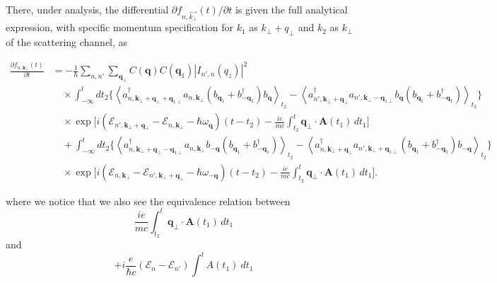 \documentclass[%
 reprint,
 amsmath,amssymb,
 aps,
]{revtex4-2}
\begin{document}
There, under analysis, the differential $\partial f_{n,\vec{k_{\bot}}}(t) / {\partial t}$ is given the full analytical expression, with specific momentum specification for $k_{1}$ as $k_{\perp}+q_{\perp}$ and $k_{2}$ as $k_{\perp}$ of the scattering channel, as
\begin{widetext}
    \begin{align}
\frac{\partial f_{n,\mathbf{k}_{\perp}}(t)}{\partial t}
&=
-\frac{1}{\hbar}
\sum_{n,n'}
\sum_{\mathbf{q}_{\perp}}
C(\mathbf{q})
C(\mathbf{q}_1)
\left| I_{n',n}(q_z) \right|^2
\nonumber\\
&\quad \times
\int_{-\infty}^{t}
dt_2
\Bigg\{
\left\langle
a^\dagger_{n,\mathbf{k}_{\perp}+\mathbf{q}_{\perp}+\mathbf{q}_{1\perp}}
a_{n,\mathbf{k}_{\perp}}
\left(b_{\mathbf{q}_1}+b^\dagger_{-\mathbf{q}_1}\right)
b_{\mathbf{q}}
\right\rangle_{t_2}
-
\left\langle
a^\dagger_{n',\mathbf{k}_{\perp}+\mathbf{q}_{\perp}}
a_{n',\mathbf{k}_{\perp}-\mathbf{q}_{1\perp}}
b_{\mathbf{q}}
\left(b_{\mathbf{q}_1}+b^\dagger_{-\mathbf{q}_1}\right)
\right\rangle_{t_2}
\Bigg\}
\nonumber\\
&\quad \times
\exp\Bigg[
i
\left(
\mathcal{E}_{n',\mathbf{k}_{\perp}+\mathbf{q}_{\perp}}
-
\mathcal{E}_{n,\mathbf{k}_{\perp}}
-
\hbar\omega_{\mathbf{q}}
\right)
(t-t_2)
-
\frac{ie}{mc}
\int_{t_2}^{t}
\mathbf{q}_{\perp}\!\cdot\!
\mathbf{A}(t_1)\,
dt_1
\Bigg]
\nonumber\\
&\quad
+
\int_{-\infty}^{t}
dt_2
\Bigg\{
\left\langle
a^\dagger_{n,\mathbf{k}_{\perp}+\mathbf{q}_{\perp}-\mathbf{q}_{1\perp}}
a_{n,\mathbf{k}_{\perp}}
b_{-\mathbf{q}}
\left(b_{\mathbf{q}_1}+b^\dagger_{-\mathbf{q}_1}\right)
\right\rangle_{t_2}
-
\left\langle
a^\dagger_{n,\mathbf{k}_{\perp}+\mathbf{q}_{\perp}}
a_{n',\mathbf{k}_{\perp}+\mathbf{q}_{1\perp}}
\left(b_{\mathbf{q}_1}+b^\dagger_{-\mathbf{q}_1}\right)
b_{-\mathbf{q}}
\right\rangle_{t_2}
\Bigg\}
\nonumber\\
&\quad \times
\exp\Bigg[
i
\left(
\mathcal{E}_{n,\mathbf{k}_{\perp}}
-
\mathcal{E}_{n',\mathbf{k}_{\perp}+\mathbf{q}_{\perp}}
-
\hbar\omega_{-\mathbf{q}}
\right)
(t-t_2)
-
\frac{ie}{mc}
\int_{t_2}^{t}
\mathbf{q}_{\perp}\!\cdot\!
\mathbf{A}(t_1)\,
dt_1
\Bigg].
\end{align}
\end{widetext}
where we notice that we also see the equivalence relation between
\begin{equation}
    \frac{ie}{mc}
\int_{t_2}^{t}
\mathbf{q}_{\perp}\!\cdot\!
\mathbf{A}(t_1)\,
dt_1
\end{equation}
and
\begin{equation}
    +i \frac{e}{\hbar c} (\mathcal{E}_{n}-\mathcal{E}_{n'})\int^{t}A(t_{1})\:dt_{1}
\end{equation}
\end{document}
